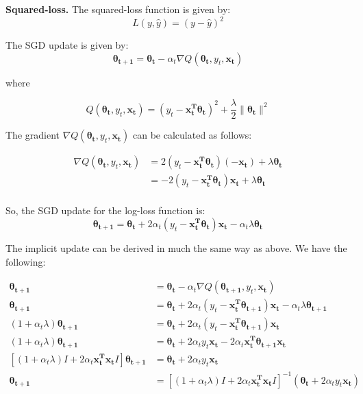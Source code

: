 \documentclass{article}
\renewcommand{\vec}[1]{\boldsymbol{#1}}
\begin{document}
\begin{enumerate}[(a)]
\textbf{Squared-loss.}
The squared-loss function is given by:
\begin{equation}
L(y, \hat{y}) = (y-\hat{y})^2
\end{equation}

The SGD update is given by:
\begin{equation}
\vec{\theta_{t+1}} = \vec{\theta_{t}} - \alpha_{t}\nabla Q(\vec{\theta_{t}}, y_t, \vec{x_t})
\end{equation}

where

\begin{equation}
Q(\vec{\theta_{t}}, y_t, \vec{x_t}) = \left(y_t - \vec{x_t^T}\vec{\theta_t}\right)^2 + \frac{\lambda}{2}\|\vec{\theta_t}\|^2
\end{equation}

The gradient $\nabla Q(\vec{\theta_{t}}, y_t, \vec{x_t})$ can be calculated as follows:

\begin{align*}
\nabla Q(\vec{\theta_{t}}, y_t, \vec{x_t}) &= 2\left(y_t - \vec{x_t^T}\vec{\theta_t}\right)\left(-\vec{x_t}\right) + \lambda\vec{\theta_t}\\
&= -2(y_t-\vec{x_t^T}\vec{\theta_t})\vec{x_t} + \lambda\vec{\theta_t}\\
\end{align*}

So, the SGD update for the log-loss function is:
\begin{equation}
\vec{\theta_{t+1}} = \vec{\theta_{t}} +2 \alpha_{t}\left( y_t-\vec{x_t^T}\vec{\theta_t} \right )\vec{x_t} - \alpha_t\lambda\vec{\theta_t}
\end{equation}

The implicit update can be derived in much the same way as above. We have the following:

\begin{align*}
\vec{\theta_{t+1}} &= \vec{\theta_t} - \alpha_t \nabla Q(\vec{\theta_{t+1}}, y_t, \vec{x_t})\\
\vec{\theta_{t+1}} &= \vec{\theta_{t}} +2 \alpha_{t}\left( y_t-\vec{x_t^T}\vec{\theta_{t+1}} \right )\vec{x_t} - \alpha_t\lambda\vec{\theta_{t+1}}\\
(1+\alpha_t\lambda)\vec{\theta_{t+1}} &= \vec{\theta_{t}} +2 \alpha_{t}\left( y_t-\vec{x_t^T}\vec{\theta_{t+1}} \right )\vec{x_t}\\
(1+\alpha_t\lambda)\vec{\theta_{t+1}} &= \vec{\theta_{t}} + 2\alpha_t y_t \vec{x_t} - 2\alpha_t\vec{x_t^T}\vec{\theta_{t+1}}\vec{x_t}\\
\left[(1+\alpha_t\lambda)I + 2\alpha_t\vec{x_t^T}\vec{x_t}I\right]\vec{\theta_{t+1}} &= \vec{\theta_t} + 2\alpha_t y_t\vec{x_t}\\
\vec{\theta_{t+1}} &= \left[(1+\alpha_t\lambda)I + 2\alpha_t\vec{x_t^T}\vec{x_t}I\right]^{-1}\left(\vec{\theta_t} + 2\alpha_t y_t \vec{x_t}\right)
\end{align*}


\end{enumerate}
\end{document}
